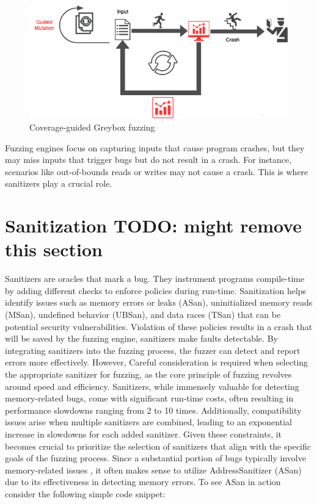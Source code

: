 \documentclass[a4paper,11pt,oneside]{report}
\begin{document}
\begin{figure}[ht]
	\centering
	\includegraphics[width=12cm]{figures/coverge_guided_red.png}
	\caption{Coverage-guided Greybox fuzzing}
	\label{fig:coverage_guided_diag}
\end{figure}


Fuzzing engines focus on capturing inputs that cause program crashes, 
but they may miss inputs that trigger bugs but do not result in a crash. 
For instance, scenarios like out-of-bounds reads or writes may not 
cause a crash. This is where sanitizers play a crucial role.

\section{Sanitization TODO: might remove this section}

Sanitizers are oracles that mark a bug. They instrument programs compile-time
by adding different checks to enforce policies during run-time. 
Sanitization helps identify issues such as memory errors or leaks (ASan), uninitialized
memory reads (MSan), undefined behavior (UBSan), and data races (TSan)
that can be potential security vulnerabilities.
Violation of these policies results in a crash that will be saved by the fuzzing engine,
sanitizers make faults detectable. 
By integrating sanitizers into the fuzzing process, the fuzzer can detect 
and report errors more effectively. However, Careful consideration is 
required when selecting the appropriate sanitizer for fuzzing, 
as the core principle of fuzzing revolves around speed and efficiency. 
Sanitizers, while immensely valuable for detecting memory-related bugs, 
come with significant run-time costs, often resulting in performance 
slowdowns ranging from 2 to 10 times. Additionally, compatibility 
issues arise when multiple sanitizers are combined, leading to an 
exponential increase in slowdowns for each added sanitizer. 
Given these constraints, it becomes crucial to prioritize the selection 
of sanitizers that align with the specific goals of the fuzzing process. 
Since a substantial portion of bugs typically involve memory-related issues \cite{memorysafety2} \cite{memorysafety1}, 
it often makes sense to utilize AddressSanitizer (ASan) due to its effectiveness 
in detecting memory errors. To see ASan in action consider the following simple code snippet:
\end{document}
